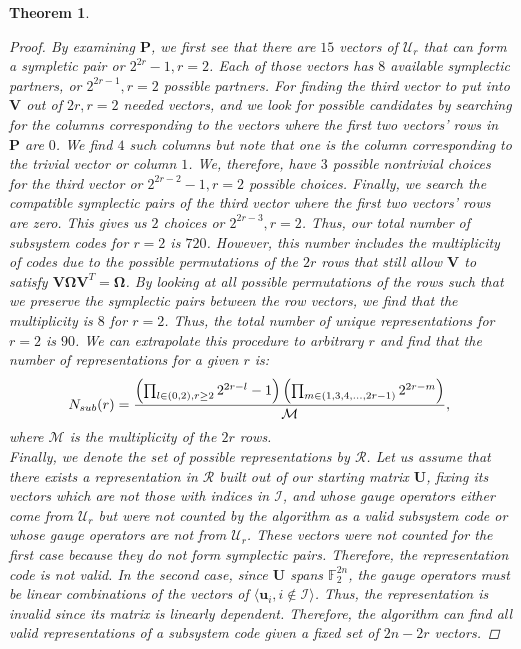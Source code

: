 \documentclass[conference]{IEEEtran}
\newtheorem{theorem}{Theorem}
\begin{document}
\begin{theorem}
\begin{proof}
    By examining $\boldsymbol{P}$, we first see that there are $15$ vectors of $\mathcal{U}_r$ that can form a sympletic pair or $2^{2r}-1, r=2$. Each of those vectors has $8$ available symplectic partners, or $2^{2r-1}, r=2$ possible partners. For finding the third vector to put into $\boldsymbol{V}$ out of $2r, r=2$ needed vectors, and we look for possible candidates by searching for the columns corresponding to the vectors where the first two vectors' rows in $\boldsymbol{P}$ are $0$. We find $4$ such columns but note that one is the column corresponding to the trivial vector or column $1$. We, therefore, have $3$ possible nontrivial choices for the third vector or $2^{2r-2}-1, r=2$ possible choices. Finally, we search the compatible symplectic pairs of the third vector where the first two vectors' rows are zero. This gives us $2$ choices or $2^{2r-3},r=2$. Thus, our total number of subsystem codes for $r=2$ is $720$. However, this number includes the multiplicity of codes due to the possible permutations of the $2r$ rows that still allow $\boldsymbol{V}$ to satisfy  $\boldsymbol{V}\boldsymbol{\Omega}\boldsymbol{V}^T=\boldsymbol{\Omega}$. By looking at all possible permutations of the rows such that we preserve the symplectic pairs between the row vectors, we find that the multiplicity is $8$ for $r=2$. Thus, the total number of unique representations for $r=2$ is $90$. We can extrapolate this procedure to arbitrary $r$ and find that the number of representations for a given $r$ is:
\begin{equation} 
N_{sub}(r)=\frac{\left( \prod_{l\in\left( 0,2 \right), r\geq 2} 2^{2r-l}-1\right)\left(\prod_{m\in\left(1,3,4,...,2r-1\right)}2^{2r-m}\right)}{\mathcal{M}},\\
 \end{equation} 
 where $\mathcal{M}$ is the multiplicity of the $2r$ rows.\\

   
Finally, we denote the set of possible representations by $\mathcal{R}$. Let us assume that there exists a representation in $\mathcal{R}$ built out of our starting matrix $\boldsymbol{U}$, fixing its vectors which are not those with indices in $\mathcal{I}$, and whose gauge operators either come from $\mathcal{U}_r$ but were not counted by the algorithm as a valid subsystem code or whose gauge operators are not from $\mathcal{U}_r$. These vectors were not counted for the first case because they do not form symplectic pairs. Therefore, the representation code is not valid. In the second case, since $\boldsymbol{U}$ spans $\mathbb{F}^{2n}_{2}$, the gauge operators must be linear combinations of the vectors of $\langle \boldsymbol{u}_i, i\notin \mathcal{I} \rangle$. Thus, the representation is invalid since its matrix is linearly dependent. Therefore, the algorithm can find all valid representations of a subsystem code given a fixed set of $2n-2r$ vectors.  
    \end{proof}
    \end{theorem}


 
\end{document}
